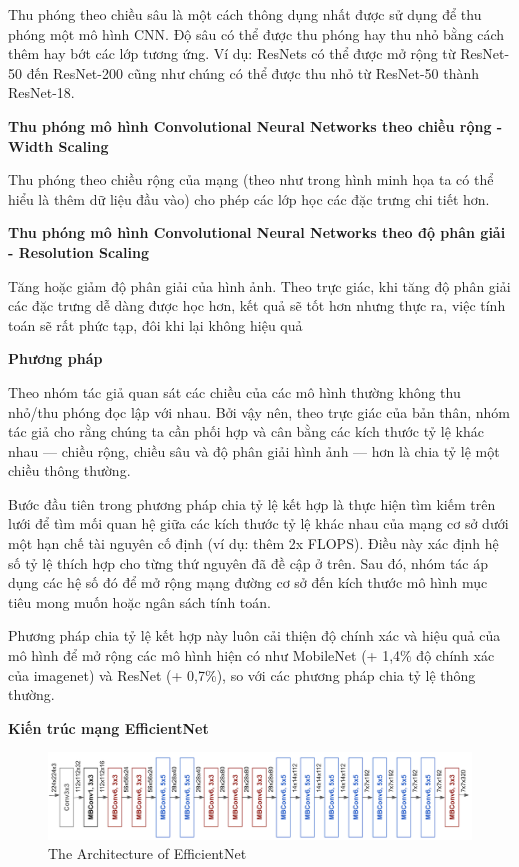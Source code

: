 \documentclass{article}
\begin{document}
	Thu phóng theo chiều sâu là một cách thông dụng nhất được sử dụng để thu phóng một mô hình CNN. Độ sâu có thể được thu phóng hay thu nhỏ bằng cách thêm hay bớt các lớp tương ứng. Ví dụ: ResNets có thể được mở rộng từ ResNet-50 đến ResNet-200 cũng như chúng có thể được thu nhỏ từ ResNet-50 thành ResNet-18.
	
	\textbf{Thu phóng mô hình Convolutional Neural Networks theo chiều rộng - Width Scaling}
	
	Thu phóng theo chiều rộng của mạng (theo như trong hình minh họa ta có thể hiểu là thêm dữ liệu đầu vào) cho phép các lớp học các đặc trưng chi tiết hơn.
	
	\textbf{Thu phóng mô hình Convolutional Neural Networks theo độ phân giải - Resolution Scaling}
	
	Tăng hoặc giảm độ phân giải của hình ảnh. Theo trực giác, khi tăng độ phân giải các đặc trưng dễ dàng được học hơn, kết quả sẽ tốt hơn nhưng thực ra, việc tính toán sẽ rất phức tạp, đôi khi lại không hiệu quả
	
	\textbf{Phương pháp}
	
	Theo nhóm tác giả quan sát các chiều của các mô hình thường không thu nhỏ/thu phóng đọc lập với nhau. Bởi vậy nên, theo trực giác của bản thân, nhóm tác giả cho rằng chúng ta cần phối hợp và cân bằng các kích thước tỷ lệ khác nhau — chiều rộng, chiều sâu và độ phân giải hình ảnh — hơn là chia tỷ lệ một chiều thông thường.
	
	Bước đầu tiên trong phương pháp chia tỷ lệ kết hợp là thực hiện tìm kiếm trên lưới để tìm mối quan hệ giữa các kích thước tỷ lệ khác nhau của mạng cơ sở dưới một hạn chế tài nguyên cố định (ví dụ: thêm 2x FLOPS). Điều này xác định hệ số tỷ lệ thích hợp cho từng thứ nguyên đã đề cập ở trên. Sau đó, nhóm tác áp dụng các hệ số đó để mở rộng mạng đường cơ sở đến kích thước mô hình mục tiêu mong muốn hoặc ngân sách tính toán.
	
	
	Phương pháp chia tỷ lệ kết hợp này luôn cải thiện độ chính xác và hiệu quả của mô hình để mở rộng các mô hình hiện có như MobileNet (+ 1,4\% độ chính xác của imagenet) và ResNet (+ 0,7\%), so với các phương pháp chia tỷ lệ thông thường.
	
	\textbf{Kiến trúc mạng EfficientNet}
	\begin{figure}[H]
		\centering
		\includegraphics[width=1\linewidth]{images/image2.png}
		\caption{The Architecture of EfficientNet }
		\label{fig:writing-thesis}
	\end{figure}
	
\end{document}

